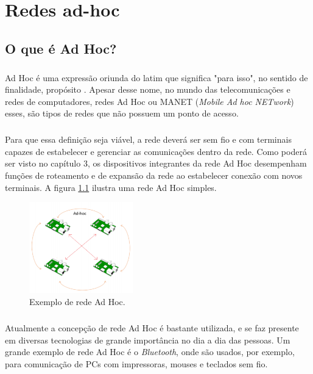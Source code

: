 \chapter{Redes ad-hoc}
\section{O que é Ad Hoc?}
\paragraph{} Ad Hoc é uma expressão oriunda do latim que significa "para isso", no sentido de finalidade, propósito \citep{Latim2014}. Apesar desse nome, no mundo das telecomunicações e redes de computadores, redes Ad Hoc ou MANET (\textit{Mobile Ad hoc NETwork}) esses, são tipos de redes que não possuem um ponto de acesso. 

\paragraph{} Para que essa definição seja viável, a rede deverá ser sem fio e com terminais capazes de estabelecer e gerenciar as comunicações dentro da rede. Como poderá ser visto no capítulo 3, os dispositivos integrantes da rede Ad Hoc desempenham funções de roteamento e de expansão da rede ao estabelecer conexão com novos terminais. A figura \ref{fig:figura1} ilustra uma rede Ad Hoc simples.

\begin{figure}[!ht]
	\centering
	\includegraphics[width=0.4\textwidth]{Figuras/ad-hoc.PNG}   
	\caption{Exemplo de rede Ad Hoc.}
	\label{fig:figura1}
\end{figure}

\paragraph{} Atualmente a concepção de rede Ad Hoc é bastante utilizada, e se faz presente em diversas tecnologias de grande importância no dia a dia das pessoas. Um grande exemplo de rede Ad Hoc é o \textit{Bluetooth}, onde são usados, por exemplo, para comunicação de PCs com impressoras, mouses e teclados sem fio. 

